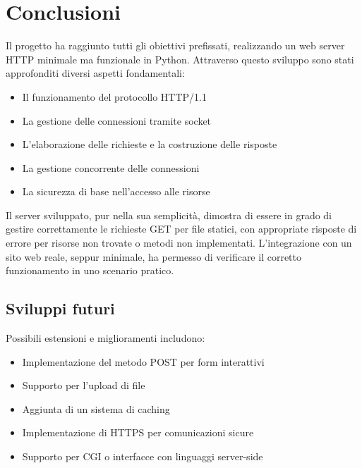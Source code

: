 \documentclass[a4paper,12pt]{report}
\begin{document}
\chapter{Conclusioni}
Il progetto ha raggiunto tutti gli obiettivi prefissati, realizzando un web server HTTP minimale ma funzionale in Python. Attraverso questo sviluppo sono stati approfonditi diversi aspetti fondamentali:
\begin{itemize}
    \item Il funzionamento del protocollo HTTP/1.1
    \item La gestione delle connessioni tramite socket
    \item L'elaborazione delle richieste e la costruzione delle risposte
    \item La gestione concorrente delle connessioni
    \item La sicurezza di base nell'accesso alle risorse
\end{itemize}

Il server sviluppato, pur nella sua semplicità, dimostra di essere in grado di gestire correttamente le richieste GET per file statici, con appropriate risposte di errore per risorse non trovate o metodi non implementati. L'integrazione con un sito web reale, seppur minimale, ha permesso di verificare il corretto funzionamento in uno scenario pratico.

\section{Sviluppi futuri}
Possibili estensioni e miglioramenti includono:
\begin{itemize}
    \item Implementazione del metodo POST per form interattivi
    \item Supporto per l'upload di file
    \item Aggiunta di un sistema di caching
    \item Implementazione di HTTPS per comunicazioni sicure
    \item Supporto per CGI o interfacce con linguaggi server-side
\end{itemize}
\end{document}
